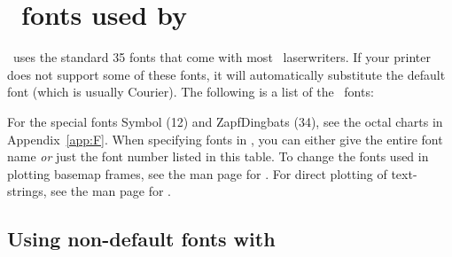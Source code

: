 %
%
\chapter{\PS\ fonts used by \gmt}
\label{app:G}

\GMT\ uses the standard 35 fonts that come with most \PS\
laserwriters.  If your printer does not support some of these
fonts, it will automatically substitute the default font (which is
usually Courier).  The following is
a list of the \GMT\ fonts: \\


For the special fonts Symbol (12) and ZapfDingbats (34), see the
octal charts in Appendix~\ref{app:F}.  When specifying fonts in
\GMT, you can either give the entire font name \emph{or} just the
font number listed in this table.  To change the fonts used in
plotting basemap frames, see the man page for
.  For direct plotting of text-strings, see
the man page for .


\section{Using non-default fonts with \GMT}
\label{sec:non-default-fonts}


